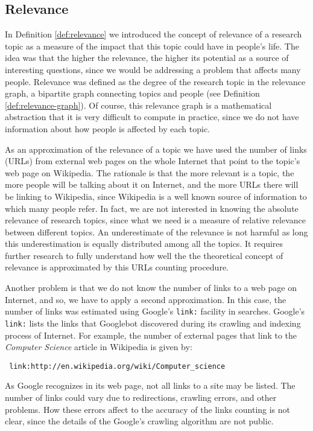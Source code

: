 \subsection{Relevance}

In Definition \ref{def:relevance} we introduced the concept of relevance of a research topic as a measure of the impact that this topic could have in people's life. The idea was that the higher the relevance, the higher its potential as a source of interesting questions, since we would be addressing a problem that affects many people. Relevance was defined as the degree of the research topic in the relevance graph, a bipartite graph connecting topics and people (see Definition \ref{def:relevance-graph}). Of course, this relevance graph is a mathematical abstraction that it is very difficult to compute in practice, since we do not have information about how people is affected by each topic.

As an approximation of the relevance of a topic we have used the number of links (URLs) from external web pages on the whole Internet that point to the topic's web page on Wikipedia. The rationale is that the more relevant is a topic, the more people will be talking about it on Internet, and the more URLs there will be linking to Wikipedia, since Wikipedia is a well known source of information to which many people refer. In fact, we are not interested in knowing the absolute relevance of research topics, since what we need is a measure of relative relevance between different topics. An underestimate of the relevance is not harmful as long this underestimation is equally distributed among all the topics. It requires further research to fully understand how well the the theoretical concept of relevance is approximated by this URLs counting procedure. 

Another problem is that we do not know the number of links to a web page on Internet, and so, we have to apply a second approximation. In this case, the number of links was estimated using Google's \texttt{link:} facility in searches. Google's \texttt{link:} lists the links that Googlebot discovered during its crawling and indexing process of Internet. For example, the number of external pages that link to the \emph{Computer Science} article in Wikipedia is given by:

\smallskip

\texttt{
link:http://en.wikipedia.org/wiki/Computer\_science
}

\smallskip

As Google recognizes in its web page, not all links to a site may be listed. The number of links could vary due to redirections, crawling errors, and other problems. How these errors affect to the accuracy of the links counting is not clear, since the details of the Google's crawling algorithm are not public.

